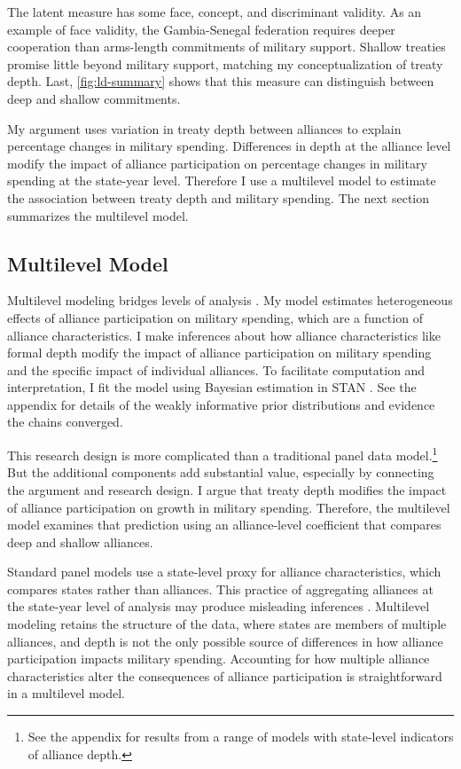 \documentclass[12pt]{article}
\begin{document}
The latent measure has some face, concept, and discriminant validity. 
As an example of face validity, the Gambia-Senegal federation requires deeper cooperation than arms-length commitments of military support. 
Shallow treaties promise little beyond military support, matching my conceptualization of treaty depth. 
Last, \autoref{fig:ld-summary} shows that this measure can distinguish between deep and shallow commitments. 


My argument uses variation in treaty depth between alliances to explain percentage changes in military spending.
Differences in depth at the alliance level modify the impact of alliance participation on percentage changes in military spending at the state-year level. 
Therefore I use a multilevel model to estimate the association between treaty depth and military spending.  
The next section summarizes the multilevel model. 


\subsection{Multilevel Model} 


Multilevel modeling bridges levels of analysis \citep{SteenbergenJones2002, GelmanHill2007}. 
My model estimates heterogeneous effects of alliance participation on military spending, which are a function of alliance characteristics. 
I make inferences about how alliance characteristics like formal depth modify the impact of alliance participation on military spending and the specific impact of individual alliances. 
To facilitate computation and interpretation, I fit the model using Bayesian estimation in STAN \citep{Carpenteretal2016}. 
See the appendix for details of the weakly informative prior distributions and evidence the chains converged.


This research design is more complicated than a traditional panel data model.\footnote{See the appendix for results from a range of models with state-level indicators of alliance depth.}
But the additional components add substantial value, especially by connecting the argument and research design.
I argue that treaty depth modifies the impact of alliance participation on growth in military spending. 
Therefore, the multilevel model examines that prediction using an alliance-level coefficient that compares deep and shallow alliances. 


Standard panel models use a state-level proxy for alliance characteristics, which compares states rather than alliances.
This practice of aggregating alliances at the state-year level of analysis may produce misleading inferences \citep[pg. 356]{McElreath2016}.
Multilevel modeling retains the structure of the data, where states are members of multiple alliances, and depth is not the only possible source of differences in how alliance participation impacts military spending. 
Accounting for how multiple alliance characteristics alter the consequences of alliance participation is straightforward in a multilevel model. 
\end{document}
